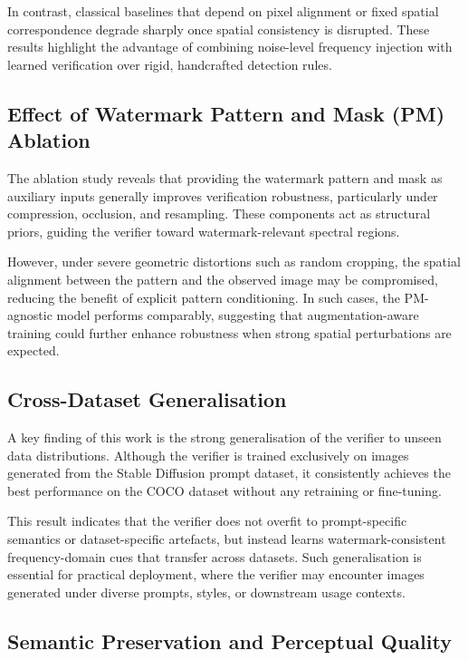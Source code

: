 In contrast, classical baselines that depend on pixel alignment or fixed spatial correspondence degrade sharply once spatial consistency is disrupted. These results highlight the advantage of combining noise-level frequency injection with learned verification over rigid, handcrafted detection rules.

\subsection{Effect of Watermark Pattern and Mask (PM) Ablation}

The ablation study reveals that providing the watermark pattern and mask as auxiliary inputs generally improves verification robustness, particularly under compression, occlusion, and resampling. These components act as structural priors, guiding the verifier toward watermark-relevant spectral regions.

However, under severe geometric distortions such as random cropping, the spatial alignment between the pattern and the observed image may be compromised, reducing the benefit of explicit pattern conditioning. In such cases, the PM-agnostic model performs comparably, suggesting that augmentation-aware training could further enhance robustness when strong spatial perturbations are expected.

\subsection{Cross-Dataset Generalisation}

A key finding of this work is the strong generalisation of the verifier to unseen data distributions. Although the verifier is trained exclusively on images generated from the Stable Diffusion prompt dataset, it consistently achieves the best performance on the COCO dataset without any retraining or fine-tuning.

This result indicates that the verifier does not overfit to prompt-specific semantics or dataset-specific artefacts, but instead learns watermark-consistent frequency-domain cues that transfer across datasets. Such generalisation is essential for practical deployment, where the verifier may encounter images generated under diverse prompts, styles, or downstream usage contexts.

\subsection{Semantic Preservation and Perceptual Quality}

